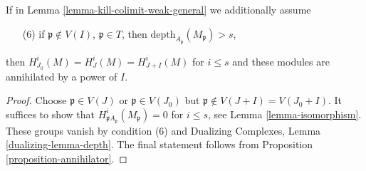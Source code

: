 \begin{lemma}
\label{lemma-kill-colimit-support-general}
If in Lemma \ref{lemma-kill-colimit-weak-general} we additionally assume
\begin{enumerate}
\item[(6)] if $\mathfrak p \not \in V(I)$, $\mathfrak p \in T$, then
$\text{depth}_{A_\mathfrak p}(M_\mathfrak p) > s$,
\end{enumerate}
then $H^i_{J_0}(M) = H^i_J(M) = H^i_{J + I}(M)$ for $i \leq s$ and these
modules are annihilated by a power of $I$.
\end{lemma}

\begin{proof}
Choose $\mathfrak p \in V(J)$ or $\mathfrak p \in V(J_0)$ but
$\mathfrak p \not \in V(J + I) = V(J_0 + I)$.
It suffices to show that $H^i_{\mathfrak pA_\mathfrak p}(M_\mathfrak p) = 0$
for $i \leq s$, see Lemma \ref{lemma-isomorphism}.
These groups vanish by condition (6) and
Dualizing Complexes, Lemma \ref{dualizing-lemma-depth}.
The final statement follows from
 Proposition \ref{proposition-annihilator}.
\end{proof}

